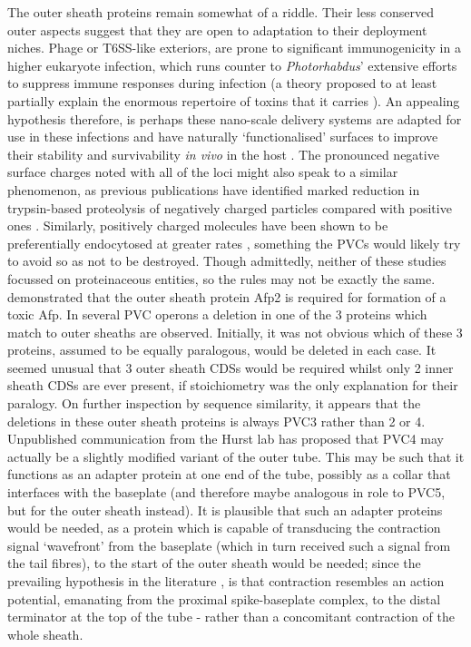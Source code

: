The outer sheath proteins remain somewhat of a riddle. Their less conserved outer aspects suggest that they are open to adaptation to their deployment niches. Phage or T6SS-like exteriors, are prone to significant immunogenicity in a higher eukaryote infection, which runs counter to \emph{Photorhabdus}' extensive efforts to suppress immune responses during infection (a theory proposed to at least partially explain the enormous repertoire of toxins that it carries \citep{Eleftherianos2010}). An appealing hypothesis therefore, is perhaps these nano-scale delivery systems are adapted for use in these infections and have naturally `functionalised' surfaces to improve their stability and survivability \emph{in vivo} in the host \citep{DelTordello2016, Kaur2012}. The pronounced negative surface charges noted with all of the loci might also speak to a similar phenomenon, as previous publications have identified marked reduction in trypsin-based proteolysis of negatively charged particles compared with positive ones \citep{Liu1992}. Similarly, positively charged molecules have been shown to be preferentially endocytosed at greater rates \citep{Chung2007}, something the PVCs would likely try to avoid so as not to be destroyed. Though admittedly, neither of these studies focussed on proteinaceous entities, so the rules may not be exactly the same. \cite{Hurst2004} demonstrated that the outer sheath protein Afp2 is required for formation of a toxic Afp. In several PVC operons a deletion in one of the 3 proteins which match to outer sheaths are observed. Initially, it was not obvious which of these 3 proteins, assumed to be equally paralogous, would be deleted in each case. It seemed unusual that 3 outer sheath CDSs would be required whilst only 2 inner sheath CDSs are ever present, if stoichiometry was the only explanation for their paralogy. On further inspection by sequence similarity, it appears that the deletions in these outer sheath proteins is always PVC3 rather than 2 or 4. Unpublished communication from the Hurst lab has proposed that PVC4 may actually be a slightly modified variant of the outer tube. This may be such that it functions as an adapter protein at one end of the tube, possibly as a collar that interfaces with the baseplate (and therefore maybe analogous in role to PVC5, but for the outer sheath instead). It is plausible that such an adapter proteins would be needed, as a protein which is capable of transducing the contraction signal `wavefront' from the baseplate (which in turn received such a signal from the tail fibres), to the start of the outer sheath would be needed; since the prevailing hypothesis in the literature \cite{Kube2015a}, is that contraction resembles an action potential, emanating from the proximal spike-baseplate complex, to the distal terminator at the top of the tube -  rather than a concomitant contraction of the whole sheath.


